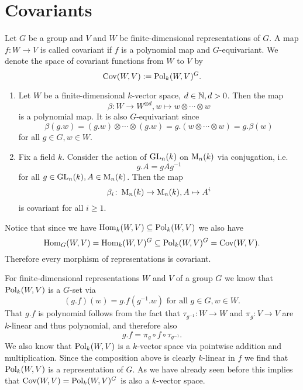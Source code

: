 \section{Covariants}


\begin{defi}
 Let $G$ be a group and $V$ and $W$ be finite-dimensional representations of $G$. A map $f \colon W \to V$ is called covariant if $f$ is a polynomial map and $G$-equivariant. We denote the space of covariant functions from $W$ to $V$ by
 \[
  \operatorname{Cov}(W,V) :=  \operatorname{Pol}_k(W,V)^G.
 \]
\end{defi}


\begin{expls}
 \begin{enumerate}\leavevmode
  \item
  Let $W$ be a finite-dimensional $k$-vector space, $d \in \mathbb{N}, d > 0$. Then the map
  \[
   \beta \colon W \to W^{\otimes d}, w \mapsto w \otimes \dotsb \otimes w
  \]
  is a polynomial map. It is also $G$-equivariant since
  \[
   \beta(g.w) = (g.w) \otimes \dotsb \otimes (g.w) = g.(w \otimes \dotsb \otimes w) = g.\beta(w)
  \]
  for all $g \in G, w \in W$.
  \item
  Fix a field $k$. Consider the action of $\operatorname{GL}_n(k)$ on $\operatorname{M}_n(k)$ via conjugation, i.e.
  \[
   g.A = gAg^{-1}
  \]
  for all $g \in \operatorname{GL}_n(k), A \in \operatorname{M}_n(k)$. Then the map
  \[
   \beta_i \colon \operatorname{M}_n(k) \to \operatorname{M}_n(k), A \mapsto A^i
  \]
  is covariant for all $i \geq 1$. 
 \end{enumerate}
\end{expls}


Notice that since we have $\operatorname{Hom}_k(W,V) \subseteq \operatorname{Pol}_k(W,V)$ we also have
\[
 \operatorname{Hom}_G(W,V) = \operatorname{Hom}_k(W,V)^G \subseteq \operatorname{Pol}_k(W,V)^G = \operatorname{Cov}(W,V).
\]
Therefore every morphism of representations is covariant.


For finite-dimensional representations $W$ and $V$ of a group $G$ we know that $\operatorname{Pol}_k(W,V)$ is a $G$-set via
\[
 (g.f)(w) = g.f\left(g^{-1}.w\right) \text{ for all } g \in G, w \in W.
\]
That $g.f$ is polynomial follows from the fact that $\tau_{g^{-1}} \colon W \to W$ and $\pi_g \colon V \to V$ are $k$-linear and thus polynomial, and therefore also
\[
 g.f = \pi_g \circ f \circ \tau_{g^{-1}}.
\]
We also know that $\operatorname{Pol}_k(W,V)$ is a $k$-vector space via pointwise addition and multiplication. Since the composition above is clearly $k$-linear in $f$ we find that $\operatorname{Pol}_k(W,V)$ is a representation of $G$. As we have already seen before this implies that $\operatorname{Cov}(W,V) = \operatorname{Pol}_k(W,V)^G$ is also a $k$-vector space.


